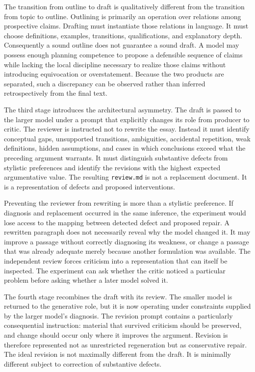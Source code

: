 \documentclass[11pt]{article}
\begin{document}
The transition from outline to draft is qualitatively different from the transition from topic to outline. Outlining is primarily an operation over relations among prospective claims. Drafting must instantiate those relations in language. It must choose definitions, examples, transitions, qualifications, and explanatory depth. Consequently a sound outline does not guarantee a sound draft. A model may possess enough planning competence to propose a defensible sequence of claims while lacking the local discipline necessary to realize those claims without introducing equivocation or overstatement. Because the two products are separated, such a discrepancy can be observed rather than inferred retrospectively from the final text.

The third stage introduces the architectural asymmetry. The draft is passed to the larger model under a prompt that explicitly changes its role from producer to critic. The reviewer is instructed not to rewrite the essay. Instead it must identify conceptual gaps, unsupported transitions, ambiguities, accidental repetition, weak definitions, hidden assumptions, and cases in which conclusions exceed what the preceding argument warrants. It must distinguish substantive defects from stylistic preferences and identify the revisions with the highest expected argumentative value. The resulting \texttt{review.md} is not a replacement document. It is a representation of defects and proposed interventions.

Preventing the reviewer from rewriting is more than a stylistic preference. If diagnosis and replacement occurred in the same inference, the experiment would lose access to the mapping between detected defect and proposed repair. A rewritten paragraph does not necessarily reveal why the model changed it. It may improve a passage without correctly diagnosing its weakness, or change a passage that was already adequate merely because another formulation was available. The independent review forces criticism into a representation that can itself be inspected. The experiment can ask whether the critic noticed a particular problem before asking whether a later model solved it.

The fourth stage recombines the draft with its review. The smaller model is returned to the generative role, but it is now operating under constraints supplied by the larger model's diagnosis. The revision prompt contains a particularly consequential instruction: material that survived criticism should be preserved, and change should occur only where it improves the argument. Revision is therefore represented not as unrestricted regeneration but as conservative repair. The ideal revision is not maximally different from the draft. It is minimally different subject to correction of substantive defects.
\end{document}
